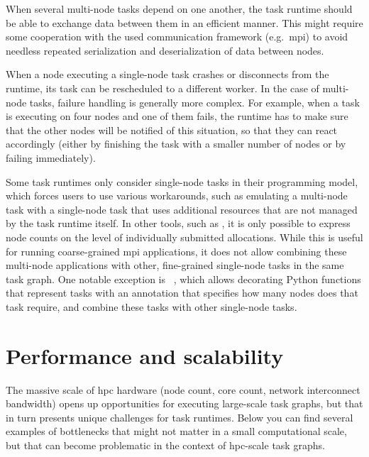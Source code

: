 \begin{description}[wide=0pt]
		When several multi-node tasks depend on one another, the task runtime should be able to exchange
		data between them in an efficient manner. This might require some cooperation with the used
		communication framework (e.g.\ \gls{mpi}) to avoid needless repeated serialization
		and deserialization of data between nodes.
	\item[Fault tolerance] When a node executing a single-node task crashes or disconnects from the runtime, its task can be
		rescheduled to a different worker. In the case of multi-node tasks, failure handling is generally
		more complex. For example, when a task is executing on four nodes and one of them fails, the
		runtime has to make sure that the other nodes will be notified of this situation, so that they can
		react accordingly (either by finishing the task with a smaller number of nodes or by failing
		immediately).
\end{description}

Some task runtimes only consider single-node tasks in their programming model, which forces users
to use various workarounds, such as emulating a multi-node task with a single-node task that
uses additional resources that are not managed by the task runtime itself. In other tools, such
as \autosubmit{}, it is only possible to express node counts on the level of individually
submitted allocations. While this is useful for running coarse-grained \gls{mpi} applications,
it does not allow combining these multi-node applications with other, fine-grained single-node
tasks in the same task graph. One notable exception is \pycompss{}~\cite{pycompss},
which allows decorating Python functions that represent tasks with an annotation that specifies how
many nodes does that task require, and combine these tasks with other single-node tasks.


\section{Performance and scalability}
The massive scale of \gls{hpc} hardware (node count, core count, network
interconnect bandwidth) opens up opportunities for executing large-scale task graphs, but that in
turn presents unique challenges for task runtimes. Below you can find several examples of
bottlenecks that might not matter in a small computational scale, but that can become problematic
in the context of \gls{hpc}-scale task graphs.

